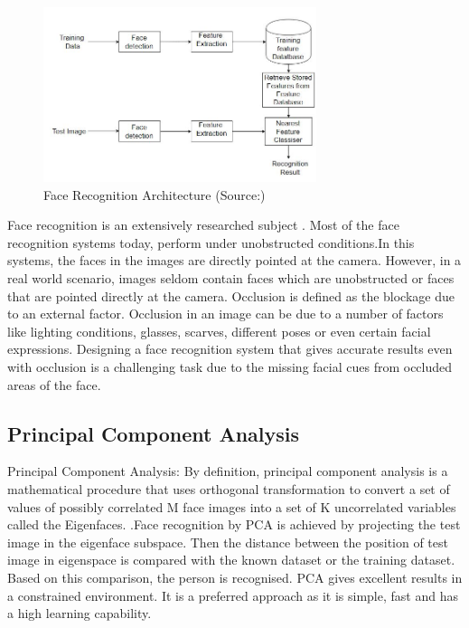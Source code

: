 \documentclass[conference]{IEEEtran}
\begin{document}
\begin{figure}[h!]
 \centering
 \includegraphics[width = 8cm]{Face_Recognition_Architecture.JPG}
 \caption{ Face Recognition Architecture (Source:\cite{makwana_makwana_2016})}
 \label{fig 1: face recognition architecture}
\end{figure}

Face recognition is an extensively researched subject\cite{zhao2003face} \cite{abate20072d}.  Most of the face recognition systems today, perform under unobstructed conditions\cite{phillips2005overview}.In this systems, the faces in the images are directly pointed at the camera. However, in a real world scenario, images seldom contain faces which are unobstructed or  faces that are pointed directly at the camera. Occlusion is defined as the blockage due to an external factor. Occlusion in an image can be due to a number of factors like lighting conditions, glasses, scarves, different poses or even certain facial expressions. Designing a face recognition system that gives accurate results even with occlusion is a challenging task due to the missing facial cues from occluded areas of the face.

\subsection{Principal Component Analysis}
\label{subsec: 1a.Principal Component Analysis}
Principal Component Analysis: By definition, principal component analysis is a mathematical procedure that uses orthogonal transformation to convert a set of values of possibly correlated M face images into a set of K uncorrelated variables called the Eigenfaces.
\cite{turk1991face}.Face recognition by PCA is achieved by projecting the test image in the eigenface subspace. Then the distance between the position of test image in eigenspace is compared with the known dataset or the training dataset. Based on this comparison, the person is recognised. PCA gives excellent results in a constrained environment. It is a preferred approach as it is simple, fast and has a high learning capability.
\end{document}
